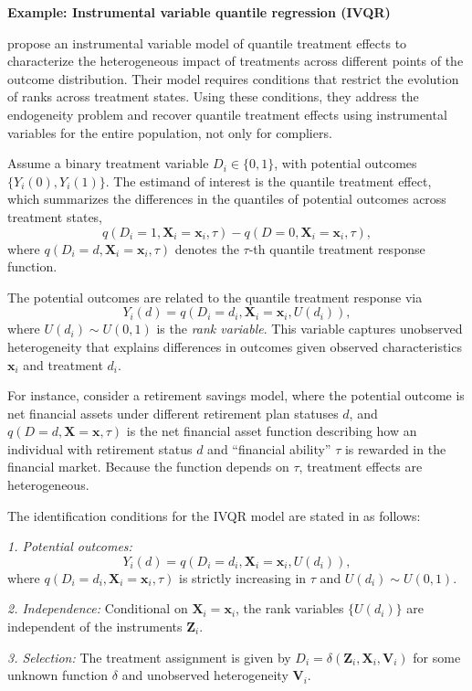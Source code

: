 \textbf{Example: Instrumental variable quantile regression (IVQR)}

\cite{Chernozhukov2005} propose an instrumental variable model of quantile treatment effects to characterize the heterogeneous impact of treatments across different points of the outcome distribution. Their model requires conditions that restrict the evolution of ranks across treatment states. Using these conditions, they address the endogeneity problem and recover quantile treatment effects using instrumental variables for the entire population, not only for compliers.  

Assume a binary treatment variable $D_i\in\{0,1\}$, with potential outcomes $\{Y_i(0),Y_i(1)\}$. The estimand of interest is the quantile treatment effect, which summarizes the differences in the quantiles of potential outcomes across treatment states,
\[
q(D_i=1,\mathbf{X}_i=\mathbf{x}_i,\tau)-q(D=0,\mathbf{X}_i=\mathbf{x}_i,\tau),
\] 
where $q(D_i=d,\mathbf{X}_i=\mathbf{x}_i,\tau)$ denotes the $\tau$-th quantile treatment response function.  

The potential outcomes are related to the quantile treatment response via
\[
Y_i(d)=q(D_i=d_i,\mathbf{X}_i=\mathbf{x}_i,U(d_i)),
\]
where $U(d_i)\sim U(0,1)$ is the \textit{rank variable}. This variable captures unobserved heterogeneity that explains differences in outcomes given observed characteristics $\mathbf{x}_i$ and treatment $d_i$.  

For instance, consider a retirement savings model, where the potential outcome is net financial assets under different retirement plan statuses $d$, and $q(D=d,\mathbf{X}=\mathbf{x},\tau)$ is the net financial asset function describing how an individual with retirement status $d$ and ``financial ability'' $\tau$ is rewarded in the financial market. Because the function depends on $\tau$, treatment effects are heterogeneous.  

The identification conditions for the IVQR model are stated in \cite{Chernozhukov2005} as follows:

\textit{1. Potential outcomes:}  
\[
Y_i(d)=q(D_i=d_i,\mathbf{X}_i=\mathbf{x}_i,U(d_i)),
\]
where $q(D_i=d_i,\mathbf{X}_i=\mathbf{x}_i,\tau)$ is strictly increasing in $\tau$ and $U(d_i)\sim U(0,1)$.  

\textit{2. Independence:} Conditional on $\mathbf{X}_i=\mathbf{x}_i$, the rank variables $\{U(d_i)\}$ are independent of the instruments $\mathbf{Z}_i$.  

\textit{3. Selection:} The treatment assignment is given by $D_i=\delta(\mathbf{Z}_i,\mathbf{X}_i,\mathbf{V}_i)$ for some unknown function $\delta$ and unobserved heterogeneity $\mathbf{V}_i$.  

